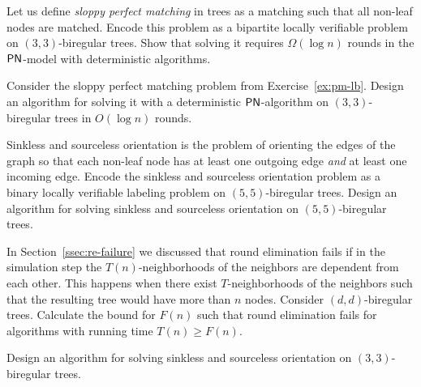 \begin{ex}\label{ex:pm-lb}
	Let us define \emph{sloppy perfect matching} in trees as a matching such that all non-leaf nodes are matched. Encode this problem as a bipartite locally verifiable problem on $(3,3)$-biregular trees. Show that solving it requires $\Omega(\log n)$ rounds in the $\textup{\sffamily PN}$-model with deterministic algorithms.
\end{ex}

\begin{ex}\label{ex:pm-ub}
	Consider the sloppy perfect matching problem from Exercise~\ref{ex:pm-lb}.
	Design an algorithm for solving it with a deterministic $\textup{\sffamily PN}$-algorithm on $(3,3)$-biregular trees in $O(\log n)$ rounds.
\end{ex}

\begin{ex}\label{ex:sinkless-sourceless}
	Sinkless and sourceless orientation is the problem of orienting the edges of the graph so that each non-leaf node has at least one outgoing edge \emph{and} at least one incoming edge.
	Encode the sinkless and sourceless orientation problem as a binary locally verifiable labeling problem on $(5,5)$-biregular trees.
	Design an algorithm for solving sinkless and sourceless orientation on $(5,5)$-biregular trees.
\end{ex}

\begin{ex} \label{ex:re-boundary}
	In Section~\ref{ssec:re-failure} we discussed that round elimination fails if in the simulation step the $T(n)$-neighborhoods of the neighbors are dependent from each other. This happens when there exist $T$-neighborhoods of the neighbors such that the resulting tree would have more than $n$ nodes.
	Consider $(d,d)$-biregular trees. Calculate the bound for $F(n)$ such that round elimination fails for algorithms with running time $T(n) \geq F(n)$.
\end{ex}

\begin{exs}\label{ex:sinkless-sourceless-3}
	Design an algorithm for solving sinkless and sourceless orientation on $(3,3)$-biregular trees.
\end{exs}

